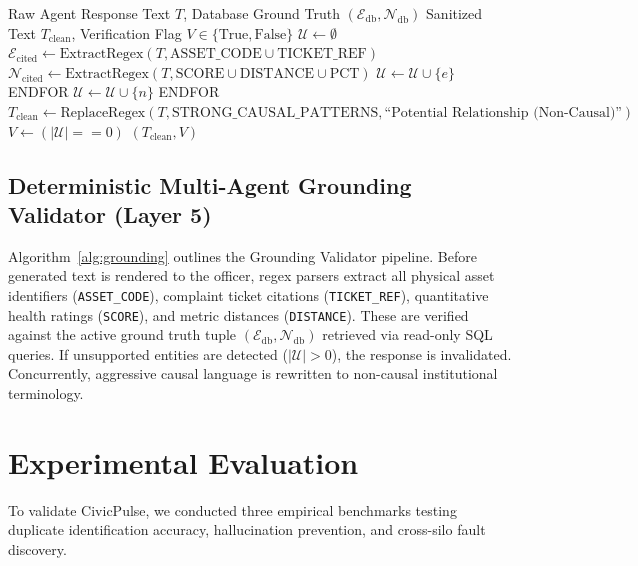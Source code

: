 \documentclass[conference]{IEEEtran}
\begin{document}
\begin{algorithm}[t]
\caption{Deterministic Grounding \& Non-Causal Verification}
\label{alg:grounding}
\begin{algorithmic}[1]
\REQUIRE Raw Agent Response Text $T$, Database Ground Truth $(\mathcal{E}_{\text{db}}, \mathcal{N}_{\text{db}})$
\ENSURE Sanitized Text $T_{\text{clean}}$, Verification Flag $V \in \{\text{True}, \text{False}\}$
\STATE $\mathcal{U} \leftarrow \emptyset$ 
\STATE $\mathcal{E}_{\text{cited}} \leftarrow \text{ExtractRegex}(T, \text{ASSET\_CODE} \cup \text{TICKET\_REF})$
\STATE $\mathcal{N}_{\text{cited}} \leftarrow \text{ExtractRegex}(T, \text{SCORE} \cup \text{DISTANCE} \cup \text{PCT})$
        \STATE $\mathcal{U} \leftarrow \mathcal{U} \cup \{e\}$
    \ENDIF
ENDFOR
        \STATE $\mathcal{U} \leftarrow \mathcal{U} \cup \{n\}$
    \ENDIF
ENDFOR
\STATE $T_{\text{clean}} \leftarrow \text{ReplaceRegex}(T, \text{STRONG\_CAUSAL\_PATTERNS}, \text{``Potential Relationship (Non-Causal)''})$
\STATE $V \leftarrow (|\mathcal{U}| == 0)$
\RETURN $(T_{\text{clean}}, V)$
\end{algorithmic}
\end{algorithm}

\subsection{Deterministic Multi-Agent Grounding Validator (Layer 5)}
Algorithm~\ref{alg:grounding} outlines the Grounding Validator pipeline. Before generated text is rendered to the officer, regex parsers extract all physical asset identifiers (\texttt{ASSET\_CODE}), complaint ticket citations (\texttt{TICKET\_REF}), quantitative health ratings (\texttt{SCORE}), and metric distances (\texttt{DISTANCE}). These are verified against the active ground truth tuple $(\mathcal{E}_{\text{db}}, \mathcal{N}_{\text{db}})$ retrieved via read-only SQL queries. If unsupported entities are detected ($|\mathcal{U}| > 0$), the response is invalidated. Concurrently, aggressive causal language is rewritten to non-causal institutional terminology.

\section{Experimental Evaluation}
To validate CivicPulse, we conducted three empirical benchmarks testing duplicate identification accuracy, hallucination prevention, and cross-silo fault discovery.
\end{document}
